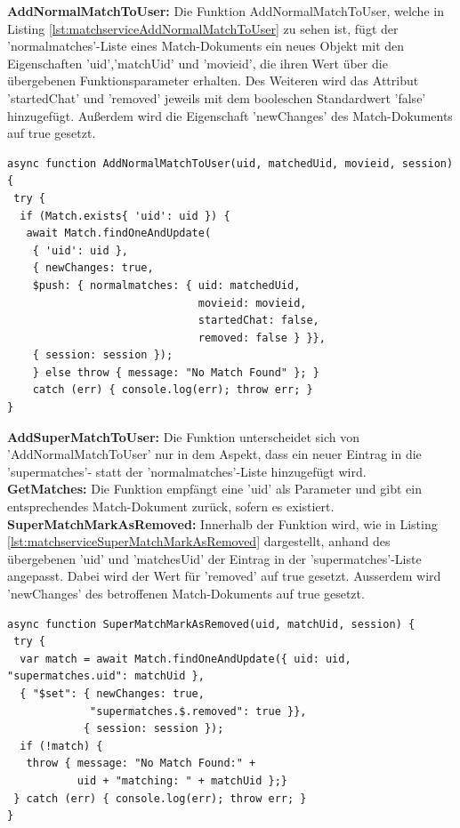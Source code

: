 \noindent
\textbf{AddNormalMatchToUser:}
Die Funktion AddNormalMatchToUser, welche in Listing \ref{lst:matchserviceAddNormalMatchToUser} zu sehen ist,  fügt der 'normalmatches'-Liste eines Match-Dokuments ein neues Objekt mit den Eigenschaften 'uid','matchUid' und 'movieid', die ihren Wert über die übergebenen Funktionsparameter erhalten. Des Weiteren wird das Attribut 'startedChat' und 'removed' jeweils mit dem booleschen Standardwert 'false' hinzugefügt. Außerdem wird die Eigenschaft 'newChanges' des Match-Dokuments auf true gesetzt.

\begin{lstlisting}[caption=Match Service - AddNormalMatchToUser, label=lst:matchserviceAddNormalMatchToUser]
async function AddNormalMatchToUser(uid, matchedUid, movieid, session) {
 try {
  if (Match.exists{ 'uid': uid }) {
   await Match.findOneAndUpdate(
    { 'uid': uid },
    { newChanges: true,
    $push: { normalmatches: { uid: matchedUid, 
                              movieid: movieid, 
                              startedChat: false, 
                              removed: false } }},
    { session: session });
    } else throw { message: "No Match Found" }; }
    catch (err) { console.log(err); throw err; }
}
\end{lstlisting}

\noindent
\textbf{AddSuperMatchToUser:}
Die Funktion unterscheidet sich von 'AddNormalMatchToUser' nur in dem Aspekt, dass ein neuer Eintrag in die 'supermatches'- statt der 'normalmatches'-Liste hinzugefügt wird.\\

\noindent
\textbf{GetMatches:}
Die Funktion empfängt eine 'uid' als Parameter und gibt ein entsprechendes Match-Dokument zurück, sofern es existiert.\\

\noindent
\textbf{SuperMatchMarkAsRemoved:}
Innerhalb der Funktion wird, wie in Listing \ref{lst:matchserviceSuperMatchMarkAsRemoved} dargestellt, anhand des übergebenen 'uid' und 'matchesUid' der Eintrag in der 'supermatches'-Liste angepasst. Dabei wird der Wert für 'removed' auf true gesetzt. Ausserdem wird 'newChanges' des betroffenen Match-Dokuments auf true gesetzt.

\begin{lstlisting}[caption=Match Service - SuperMatchMarkAsRemoved, label=lst:matchserviceSuperMatchMarkAsRemoved]
async function SuperMatchMarkAsRemoved(uid, matchUid, session) {
 try {
  var match = await Match.findOneAndUpdate({ uid: uid, "supermatches.uid": matchUid },
  { "$set": { newChanges: true,
             "supermatches.$.removed": true }},
            { session: session });
  if (!match) {
   throw { message: "No Match Found:" + 
           uid + "matching: " + matchUid };}
 } catch (err) { console.log(err); throw err; }
}
\end{lstlisting}

